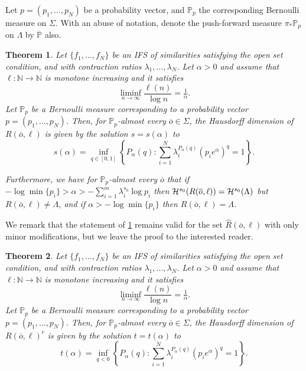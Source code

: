 \documentclass[12pt,]{article}
\newtheorem{theorem}{Theorem}[section]
\theoremstyle{definition}
\theoremstyle{remark}
\renewcommand{\Bbb}[1]{\mathbb{#1}}
\newcommand{\bbP}{{\Bbb P}}
\newcommand{\cH}{{\cal H}}
\newcommand{\0}{\mathbf{0}}
\newcommand{\bo}{{\overline o}}
\begin{document}
Let $p=(p_1, \dots, p_N)$ be a probability vector, and $\bbP_p$ the corresponding Bernoulli measure on $\Sigma$. With an abuse of notation, denote the push-forward measure $\pi_*\bbP_p$ on $\Lambda$ by $\bbP$ also.

\begin{theorem}\label{thm:main}
  Let $\{f_1, \dots, f_N\}$ be an IFS of similarities satisfying the open set condition, and with contraction ratios $\lambda_1, \dots, \lambda_N$. Let $\alpha>0$ and assume that $\ell: \mathbb N\to \mathbb N$ is monotone increasing and it satisfies
  \begin{equation}\label{eq:condonl}
    \liminf_{n\to \infty} \frac{\ell(n)}{\log n}=\tfrac 1\alpha.
  \end{equation}
  Let $\bbP_p$ be a Bernoulli measure corresponding to a probability vector $p=(p_1, \dots, p_N)$. Then, for $\bbP_{p}$-almost every $\bo \in \Sigma$, the Hausdorff dimension of $R(\bo, \ell)$ is given by the solution $s=s(\alpha)$ to
  \begin{equation}\label{eq:salpha}
    s(\alpha)=\inf_{q\in[0,1]} \left\{P_\alpha(q) : \sum_{i=1}^N \lambda_i^{P_{\alpha}(q)}(p_ie^\alpha)^q=1\right\}.
  \end{equation}

  Furthermore, we have for $\bbP_{p}$-almost every $\bo$ that if $-\log\min\{p_i\}>\alpha>-
  \sum_{i=1}^m \lambda_i^{s_0}\log  p_i$ then $\cH^{s_0}(R(\bo, \ell))=\cH^{s_0}(\Lambda)$ but
  $R(\bo, \ell)\neq\Lambda$, and if $\alpha>-\log\min\{p_i\}$ then $R(\bo, \ell)=\Lambda$.
\end{theorem}

We remark that the statement of \cref{thm:main} remains valid for the set $\widehat R(\bo,\ell)$ with only minor modifications, but we leave the proof to the interested reader.

\begin{theorem}\label{thm:main2}
  Let $\{f_1, \dots, f_N\}$ be an IFS of similarities satisfying the open set condition, and with
  contraction ratios $\lambda_1, \dots, \lambda_N$. Let $\alpha>0$ and assume that $\ell: \mathbb
  N\to \mathbb N$ is monotone increasing and it satisfies
  \begin{equation}\label{eq:condonl2}
    \liminf_{n\to \infty} \frac{\ell(n)}{\log n}=\tfrac 1\alpha.
  \end{equation}
  Let $\bbP_p$ be a Bernoulli measure corresponding to a probability vector $p=(p_1, \dots, p_N)$. Then, for $\bbP_{p}$-almost every $\bo \in \Sigma$, the Hausdorff dimension of $R(\bo, \ell)^c$ is given by the solution $t=t(\alpha)$ to
  \begin{equation}\label{eq:salpha2}
    t(\alpha)=\inf_{q<0} \left\{P_\alpha(q) : \sum_{i=1}^N \lambda_i^{P_{\alpha}(q)}(p_ie^\alpha)^q=1\right\}.
  \end{equation}
\end{theorem}
\end{document}

